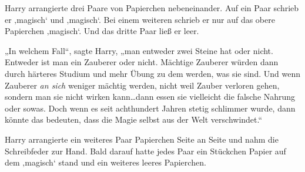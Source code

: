 Harry arrangierte drei Paare von Papierchen nebeneinander. Auf ein Paar schrieb er ‚magisch‘ und ‚magisch‘. Bei einem weiteren schrieb er nur auf das obere Papierchen ‚magisch‘. Und das dritte Paar ließ er leer.

„In welchem Fall“, sagte Harry, „man entweder zwei Steine hat oder nicht. Entweder ist man ein Zauberer oder nicht. Mächtige Zauberer würden dann durch härteres Studium und mehr Übung zu dem werden, was sie sind. Und wenn Zauberer \emph{an sich} weniger mächtig werden, nicht weil Zauber verloren gehen, sondern man sie nicht wirken kann…dann essen sie vielleicht die falsche Nahrung oder sowas. Doch wenn es seit achthundert Jahren stetig schlimmer wurde, dann könnte das bedeuten, dass die Magie selbst aus der Welt verschwindet.“

Harry arrangierte ein weiteres Paar Papierchen Seite an Seite und nahm die Schreibfeder zur Hand. Bald darauf hatte jedes Paar ein Stückchen Papier auf dem ‚magisch‘ stand und ein weiteres leeres Papierchen.

